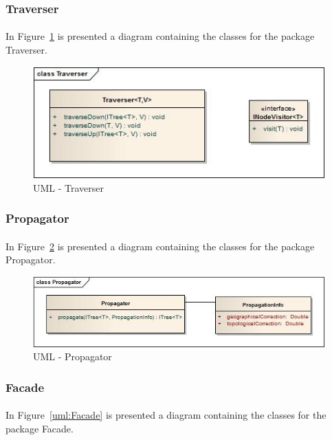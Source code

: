 \documentclass[a4paper,10pt]{article}
\begin{document}
\subsubsection{Traverser}
\paragraph{}
In Figure~\ref{uml:Traverser} is presented a diagram containing the classes for the package Traverser.

  \begin{figure}
  \centering
  \includegraphics[scale=0.5]{images/Traverser.jpg}  
  \caption{UML - Traverser}
  \label{uml:Traverser}
  \end{figure} 

\subsubsection{Propagator}
\paragraph{}
In Figure~\ref{uml:Propagator} is presented a diagram containing the classes for the package Propagator.

  \begin{figure}
  \centering
  \includegraphics[scale=0.5]{images/Propagator.jpg}  
  \caption{UML - Propagator}
  \label{uml:Propagator}
  \end{figure} 

\subsubsection{Facade}
\paragraph{}
In Figure~\ref{uml:Facade} is presented a diagram containing the classes for the package Facade.
\end{document}
